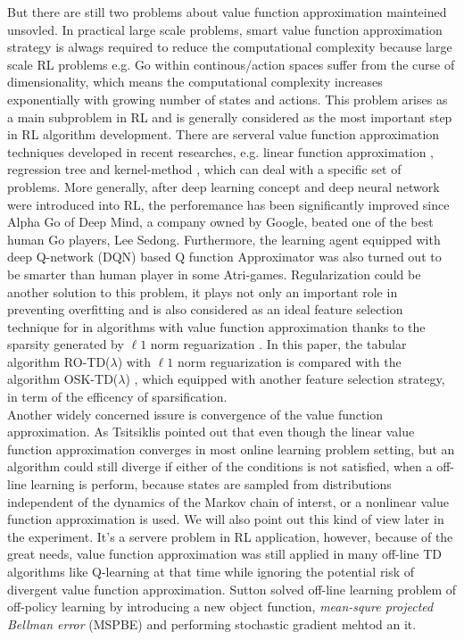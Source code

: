 \documentclass[conference]{IEEEtran}
\begin{document}
But there are still two problems about value function approximation mainteined unsovled. In practical large scale problems, smart value function approximation strategy is alwags required to reduce the computational complexity because large scale RL problems e.g. Go within continous/action spaces suffer from the curse of dimensionality, which means the computational complexity increases exponentially with growing number of states and actions. This problem arises as a main subproblem in RL and is generally considered as the most important step in RL algorithm development. There are serveral value function approximation techniques developed in recent researches, e.g. linear function approximation \cite{sutton1998reinforcement} \cite{tsitsiklis1997analysis}, regression tree \cite{ernst2005tree} and kernel-method \cite{xu2007kernel}\cite{ormoneit2002kernel}, which can deal with a specific set of problems. More generally, after deep learning \cite{lecun2015deep} concept and deep neural network were introduced into RL, the perforemance has been significantly improved since Alpha Go of Deep Mind, a company owned by Google, beated one of the best human Go players, Lee Sedong. Furthermore, the learning agent equipped with deep Q-network (DQN) \cite{mnih2015human} based Q function Approximator was also turned out to be smarter than human player in some Atri-games. Regularization could be another solution to this problem, it plays not only an important role in preventing overfitting and is also considered as an ideal feature selection technique for in algorithms with value function approximation thanks to the sparsity generated by $\ell1$ norm reguarization\cite{kolter2009regularization} \cite{liu2012regularized}. In this paper, the tabular algorithm RO-TD($\lambda$) with $\ell1$ norm reguarization is compared with the algorithm OSK-TD($\lambda$) \cite{chen2013online}, which equipped with another feature selection strategy, in term of the efficency of sparsification.\\

Another widely concerned issure is convergence of the value function approximation. As Tsitsiklis \cite{tsitsiklis1997analysis} pointed out that even though the linear value function approximation converges in most online learning problem setting, but an algorithm could still diverge if either of the conditions is not satisfied, when a off-line learning is perform, because states are sampled from distributions independent of the dynamics of the Markov chain of interst, or a nonlinear value function approximation is used. We will also point out this kind of view later in the experiment. It's a servere problem in RL application, however, because of the great needs, value function approximation was still applied in many off-line TD algorithms like Q-learning at that time while ignoring the potential risk of divergent value function approximation. Sutton \cite{sutton1998reinforcement}\cite{sutton2009fast} solved off-line learning problem of off-policy learning by introducing a new object function, \textit{mean-squre projected Bellman error} (\textup{MSPBE}) and performing stochastic gradient mehtod an it.\\
\end{document}
